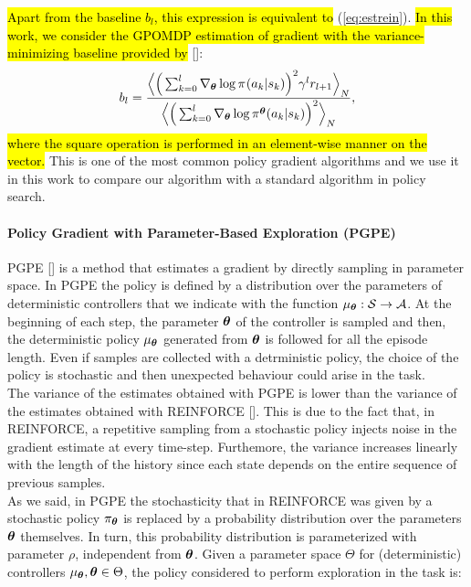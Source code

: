 \hl{Apart from the baseline $b_l$, this expression is equivalent to} (\ref{eq:estrein}). 
\hl{In this work, we consider the GPOMDP estimation of gradient with the variance-minimizing baseline provided by} [\cite{Peters2008ReinforcementLO}]:
\begin{align} b_l = \frac{\Big\langle\Big( \sum_{k=0}^{l}\nabla_{\boldsymbol{\theta}} \log\pi^{}(a_k|s_k)\Big)^2 \gamma^{l}r_{l+1}\Big\rangle_{N}} {\Big\langle\Big( \sum_{k=0}^{l}\nabla_{\boldsymbol{\theta}} \log\pi^{\boldsymbol{\theta}}(a_k|s_k)\Big)^2\Big\rangle_{N}},
\end{align}
\hl{where the square operation is performed in an element-wise manner on the vector.}
This is one of the most common policy gradient algorithms and we use it in this work to compare our algorithm with a standard algorithm in policy search.

\paragraph{Policy Gradient with Parameter-Based Exploration (PGPE)} \label{subsec:pgpe}
\ac{PGPE} [\cite{sehnke2008PolicyGradient}] is a method that estimates a gradient by directly sampling in parameter space. In \ac{PGPE} the policy is defined by a distribution over the parameters of deterministic controllers that we indicate with the function $\mu_{\boldsymbol{\theta}}: \mathcal{S} \to \mathcal{A}$. At the beginning of each step, the parameter $\boldsymbol{\theta}$ of the controller is sampled and then, the deterministic policy $\mu_{\boldsymbol{\theta}}$ generated from $\boldsymbol{\theta}$ is followed for all the episode length. Even if samples are collected with a detrministic policy, the choice of the policy is stochastic and then unexpected behaviour could arise in the task.\\
\newline
The variance of the estimates obtained with \ac{PGPE} is lower than the variance of the estimates obtained with REINFORCE [\cite{zhao2013efficient}]. This is due to the fact that, in REINFORCE, a repetitive sampling from a stochastic policy injects noise in the gradient estimate at every time-step. Furthemore, the variance increases linearly with the length of the history since each state depends on the entire sequence of previous samples.\\
\newline
As we said, in \ac{PGPE} the stochasticity that in REINFORCE was given by a stochastic policy $\pi_{\boldsymbol{\theta}}$ is replaced by a probability distribution over the parameters $\boldsymbol{\theta}$ themselves. In turn, this probability distribution is parameterized with parameter $\rho$, independent from $\boldsymbol{\theta}$. Given a parameter space $\Theta$ for (deterministic) controllers $\mu_{\boldsymbol{\theta}}, \boldsymbol{\theta} \in \Theta$, the policy considered to perform exploration in the task is:
